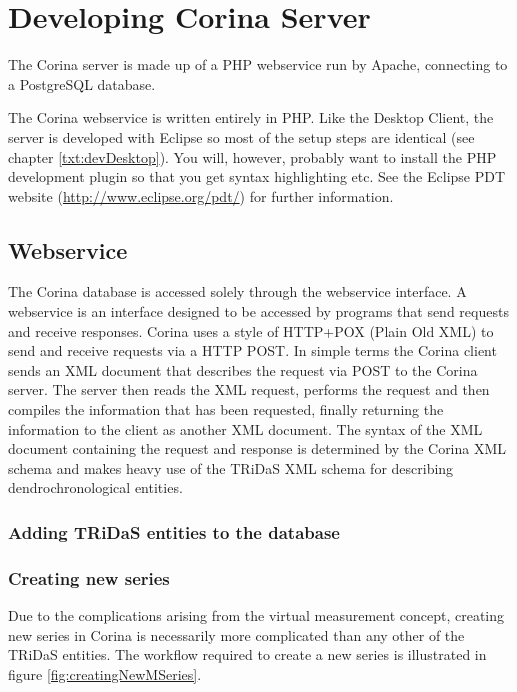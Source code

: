 \chapter{Developing Corina Server}

The Corina server is made up of a PHP webservice run by Apache, connecting to a PostgreSQL database.  

The Corina webservice is written entirely in PHP.  Like the Desktop Client, the server is developed with Eclipse so most of the setup steps are identical (see chapter \ref{txt:devDesktop}).  You will, however, probably want to install the PHP development plugin so that you get syntax highlighting etc.  See the Eclipse PDT website (\url{http://www.eclipse.org/pdt/}) for further information.


\section{Webservice }

The Corina database is accessed solely through the webservice interface.  A webservice is an interface designed to be accessed by programs that send requests and receive responses.  Corina uses a style of HTTP+POX (Plain Old XML) to send and receive requests via a HTTP POST.  In simple terms the Corina client sends an XML document that describes the request via POST to the Corina server.  The server then reads the XML request, performs the request and then compiles the information that has been requested, finally returning the information to the client as another XML document.  The syntax of the XML document containing the request and response is determined by the Corina XML schema and makes heavy use of the TRiDaS XML schema for describing dendrochronological entities.


\subsection{Adding TRiDaS entities to the database}

\subsection{Creating new series}

Due to the complications arising from the virtual measurement concept, creating new series in Corina is necessarily more complicated than any other of the TRiDaS entities.  The workflow required to create a new series is illustrated in figure \ref{fig:creatingNewMSeries}.

